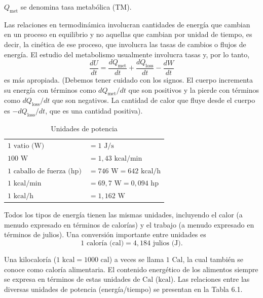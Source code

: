 \documentclass[12pt]{book}
\begin{document}
$Q_{\text{met}}$ se denomina tasa metabólica (TM).

Las relaciones en termodinámica involucran cantidades de energía que cambian en un proceso en equilibrio y no aquellas que cambian por unidad de tiempo, es decir, la cinética de ese proceso, que involucra las tasas de cambios o flujos de energía. El estudio del metabolismo usualmente involucra tasas y, por lo tanto,
\begin{equation}
\frac{dU}{dt} = \frac{dQ_{\text{met}}}{dt} + \frac{dQ_{\text{loss}}}{dt} - \frac{dW}{dt}
\label{eq:63}
\end{equation}
es más apropiada. (Debemos tener cuidado con los signos. El cuerpo incrementa su energía con términos como $dQ_{\text{met}}/dt$ que son positivos y la pierde con términos como $dQ_{\text{loss}}/dt$ que son negativos. La cantidad de calor que fluye desde el cuerpo es $-dQ_{\text{loss}}/dt$, que es una cantidad positiva).

\begin{table}[htbp]
\centering
\caption{Unidades de potencia}
\label{tab:61}
\begin{tabularx}{0.6\textwidth}{l >{\raggedright\arraybackslash}X}
\toprule
$1\text{ vatio (W)}$ & $= 1\text{ J/s}$ \\
$100\text{ W}$ & $= 1,43\text{ kcal/min}$ \\
$1\text{ caballo de fuerza (hp)}$ & $= 746\text{ W} = 642\text{ kcal/h}$ \\
$1\text{ kcal/min}$ & $= 69,7\text{ W} = 0,094\text{ hp}$ \\
$1\text{ kcal/h}$ & $= 1,162\text{ W}$ \\
\bottomrule
\end{tabularx}
\end{table}

Todos los tipos de energía tienen las mismas unidades, incluyendo el calor (a menudo expresado en términos de calorías) y el trabajo (a menudo expresado en términos de julios). Una conversión importante entre unidades es
\begin{equation}
1\text{ caloría (cal)} = 4,184\text{ julios (J)}.
\label{eq:64}
\end{equation}

Una kilocaloría ($1\text{ kcal} = 1000\text{ cal}$) a veces se llama $1\text{ Cal}$, la cual también se conoce como caloría alimentaria. El contenido energético de los alimentos siempre se expresa en términos de estas unidades de $\text{Cal}$ ($\text{kcal}$). Las relaciones entre las diversas unidades de potencia (energía/tiempo) se presentan en la Tabla 6.1.
\end{document}
